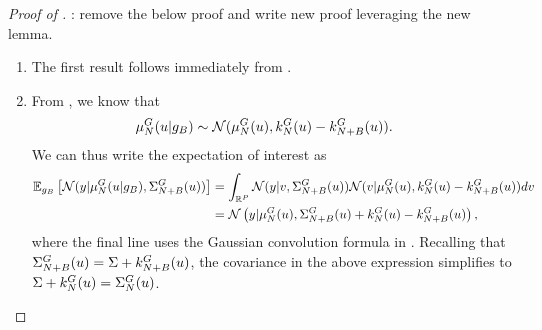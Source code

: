 \documentclass[12pt]{article}
\begin{document}
\begin{proof} [Proof of ]
\todo: remove the below proof and write new proof leveraging the new lemma. 
\begin{enumerate}
\item The first result follows immediately from . 
\item From , we know that 
\begin{align*}
\emMean[\Ndesign]{\fwd}(\Par|\designBatchFwd)
&\sim \Gaussian(\emMean[\Ndesign]{\fwd}(\Par), \emKer[\Ndesign]{\fwd}(\Par) - \emKer[\Naugment]{\fwd}(\Par)). 
\end{align*}
We can thus write the expectation of interest as 
\begin{align*}
\E_{\designBatchFwd}\left[\Gaussian(\obs | \emMean[\Ndesign]{\fwd}(\Par| \designBatchFwd), \CovComb[\Naugment](\Par)) \right]
&= \int_{\R^{\dimObs}} \Gaussian(\obs| v, \CovComb[\Naugment](\Par)) 
\Gaussian(v | \emMean[\Ndesign]{\fwd}(\Par), \emKer[\Ndesign]{\fwd}(\Par) - \emKer[\Naugment]{\fwd}(\Par)) dv \\
&= \Gaussian\left(\obs | \emMean[\Ndesign]{\fwd}(\Par), \CovComb[\Naugment](\Par) + \emKer[\Ndesign]{\fwd}(\Par) - \emKer[\Naugment]{\fwd}(\Par)\right), 
\end{align*}
where the final line uses the Gaussian convolution formula in . Recalling that 
$\CovComb[\Naugment](\Par) = \likPar + \emKer[\Naugment]{\fwd}(\Par)$, the covariance in the above expression simplifies to 
$\likPar + \emKer[\Ndesign]{\fwd}(\Par) = \CovComb[\Ndesign](\Par)$. 


\end{enumerate}
\end{proof}
\end{document}
